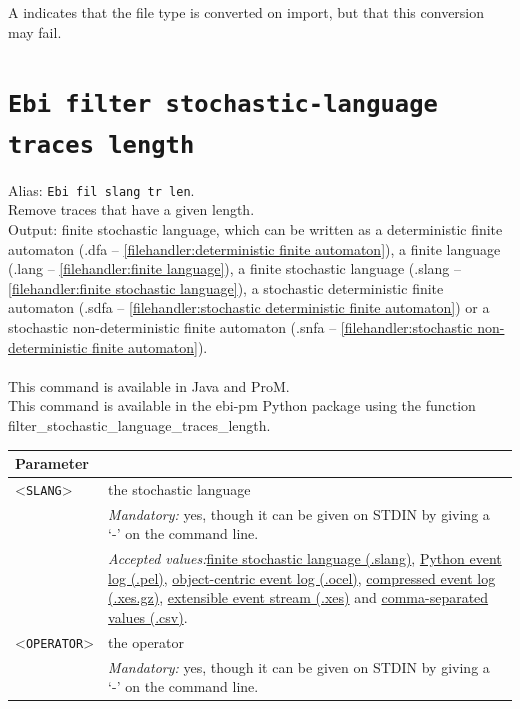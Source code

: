 {\begin{tabularx}{\linewidth}{lX}
\bottomrule
\end{tabularx}
A \textdagger{} indicates that the file type is converted on import, but that this conversion may fail.
\clearpage\section{\texttt{Ebi filter stochastic-language traces length}}
\label{command:Ebi filter stochastic-language traces length}
Alias: \texttt{Ebi fil slang tr len}.\\
Remove traces that have a given length.\\
\noindent Output: finite stochastic language, which can be written as a deterministic finite automaton (.dfa -- \cref{filehandler:deterministic finite automaton}), a finite language (.lang -- \cref{filehandler:finite language}), a finite stochastic language (.slang -- \cref{filehandler:finite stochastic language}), a stochastic deterministic finite automaton (.sdfa -- \cref{filehandler:stochastic deterministic finite automaton}) or a stochastic non-deterministic finite automaton (.snfa -- \cref{filehandler:stochastic non-deterministic finite automaton}).\\
\\This command is available in Java and ProM.
\\This command is available in the ebi-pm Python package using the function filter\_stochastic\_language\_traces\_length.
\begin{tabularx}{\linewidth}{lX}
\toprule
Parameter \\\midrule
<\texttt{SLANG}>&the stochastic language\\
&\textit{Mandatory:} \quad yes, though it can be given on STDIN by giving a `-' on the command line.\\
&\textit{Accepted values:}\quad \hyperref[filehandler:finite stochastic language]{finite stochastic language (.slang)}, \hyperref[filehandler:Python event log]{Python event log (.pel)}, \hyperref[filehandler:object-centric event log]{object-centric event log (.ocel)}, \hyperref[filehandler:compressed event log]{compressed event log (.xes.gz)}, \hyperref[filehandler:extensible event stream]{extensible event stream (.xes)} and \hyperref[filehandler:comma-separated values]{comma-separated values (.csv)}.\\
<\texttt{OPERATOR}>&the operator\\
&\textit{Mandatory:} \quad yes, though it can be given on STDIN by giving a `-' on the command line.\\

\end{tabularx}}
